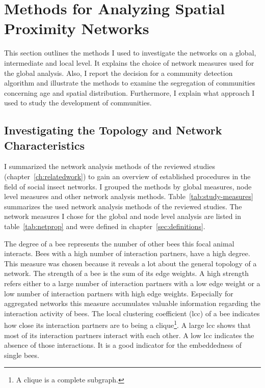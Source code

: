 \section{Methods for Analyzing Spatial Proximity Networks}
This section outlines the methods I used to investigate the networks on a global, intermediate and local level.
It explains the choice of network measures used for the global analysis.
Also, I report the decision for a community detection algorithm and illustrate the methods to examine the segregation of communities concerning age and spatial distribution.
Furthermore, I explain what approach I used to study the development of communities.

\subsection{Investigating the Topology and Network Characteristics}
\label{subsec:APmeasures}
I summarized the network analysis methods of the reviewed studies (chapter~\ref{ch:relatedwork}) to gain an overview of established procedures in the field of social insect networks. I grouped the methods by global measures, node level measures and other network analysis methods.
Table~\ref{tab:study-measures} summarizes the used network analysis methods of the reviewed studies.
The network measures I chose for the global and node level analysis are listed in table~\ref{tab:netprop} and were defined in chapter~\ref{sec:definitions}.

The degree of a bee represents the number of other bees this focal animal interacts.
Bees with a high number of interaction partners, have a high degree.
This measure was chosen because it reveals a lot about the general topology of a network.
The strength of a bee is the sum of its edge weights. A high strength refers either to a large number of interaction partners with a low edge weight or a low number of interaction partners with high edge weights. Especially for aggregated networks this measure accumulates valuable information regarding the interaction activity of bees.
The local clustering coefficient (lcc) of a bee indicates how close its interaction partners are to being a clique\footnote{A clique is a complete subgraph.}. A large lcc shows that most of its interaction partners interact with each other. A low lcc indicates the absence of those interactions.
It is a good indicator for the embeddedness of single bees.

